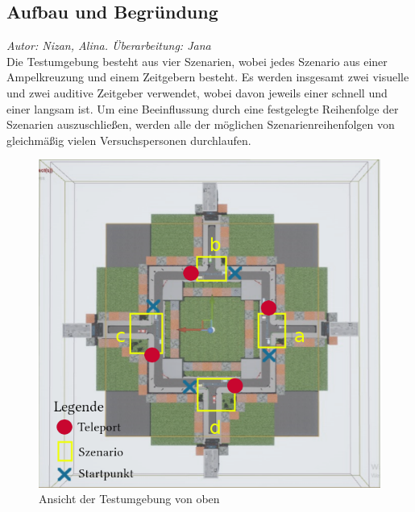 \documentclass{Paper}
\begin{document}


\subsection{Aufbau und Begründung}
\label{aufbau}
       \textit{Autor: Nizan, Alina. Überarbeitung: Jana}\\
Die Testumgebung besteht aus vier Szenarien, wobei jedes Szenario aus einer Ampelkreuzung und einem Zeitgebern besteht. Es werden insgesamt zwei visuelle und zwei auditive Zeitgeber verwendet, wobei davon jeweils einer schnell und einer langsam ist.
Um eine Beeinflussung durch eine festgelegte Reihenfolge der Szenarien auszuschließen, werden alle der möglichen Szenarienreihenfolgen von gleichmäßig vielen Versuchspersonen durchlaufen.

\begin{figure}[H]
	\centering
	\includegraphics[scale=0.7]{../Bilder/mapLegende.png}
	\caption{Ansicht der Testumgebung von oben}
	\label{img:map}
\end{figure}
\end{document}

